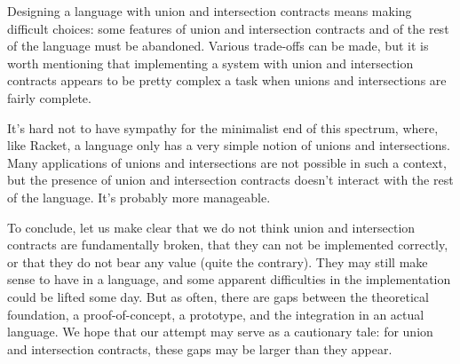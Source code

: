 \documentclass[sigplan,10pt]{acmart}
\begin{document}
Designing a language with union and intersection contracts means
making difficult choices: some features of union and intersection
contracts and of the rest of the language must be abandoned. Various
trade-offs can be made, but it is worth mentioning that implementing a
system with union and intersection contracts appears to be pretty
complex a task when unions and intersections are fairly complete.

It's hard not to have sympathy for the minimalist end of this
spectrum, where, like Racket, a language only has a very simple notion
of unions and intersections. Many applications of unions and
intersections are not possible in such a context, but the presence of
union and intersection contracts doesn't interact with the rest of the
language. It's probably more manageable.

To conclude, let us make clear that we do not think union and intersection
contracts are fundamentally broken, that they can not be implemented correctly,
or that they do not bear any value (quite the contrary). They may still make
sense to have in a language, and some apparent difficulties in the
implementation could be lifted some day. But as often, there are gaps between
the theoretical foundation, a proof-of-concept, a prototype, and the integration
in an actual language. We hope that our attempt may serve as a cautionary tale:
for union and intersection contracts, these gaps may be larger than
they appear.


\end{document}
